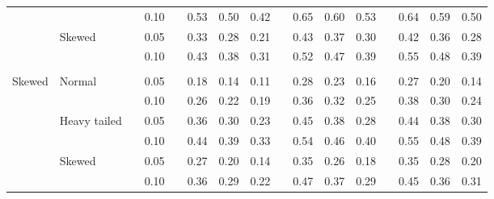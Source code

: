 \documentclass[12pt]{article} %
\begin{document}
\begin{table}[ht]
\begin{scriptsize}
\begin{center}
\begin{tabular}{ll p{.1cm} c p{.1cm} rrr p{.1cm} rrr p{.1cm} rrr}
             &              && 0.10 &&   0.53 & 0.50 & 0.42 && 0.65 & 0.60 & 0.53 &&  0.64 & 0.59 & 0.50 \\
             & Skewed       && 0.05 &&   0.33 & 0.28 & 0.21 && 0.43 & 0.37 & 0.30 &&  0.42 & 0.36 & 0.28 \\
             &              && 0.10 &&   0.43 & 0.38 & 0.31 && 0.52 & 0.47 & 0.39 &&  0.55 & 0.48 & 0.39 \\
             &&&&&&&&&&&&&&&\\
Skewed       & Normal       && 0.05 &&   0.18 & 0.14 & 0.11 && 0.28 & 0.23 & 0.16 && 0.27 & 0.20 & 0.14 \\ 
             &              && 0.10 &&   0.26 & 0.22 & 0.19 && 0.36 & 0.32 & 0.25 && 0.38 & 0.30 & 0.24 \\ 
             & Heavy tailed && 0.05 &&   0.36 & 0.30 & 0.23 && 0.45 & 0.38 & 0.28 && 0.44 & 0.38 & 0.30 \\ 
             &              && 0.10 &&   0.44 & 0.39 & 0.33 && 0.54 & 0.46 & 0.40 && 0.55 & 0.48 & 0.39 \\ 
             & Skewed       && 0.05 &&   0.27 & 0.20 & 0.14 && 0.35 & 0.26 & 0.18 && 0.35 & 0.28 & 0.20 \\ 
             &              && 0.10 &&   0.36 & 0.29 & 0.22 && 0.47 & 0.37 & 0.29 && 0.45 & 0.36 & 0.31 \\ 



\end{tabular}
\end{center}
\end{scriptsize}
\end{table}
\end{document}

